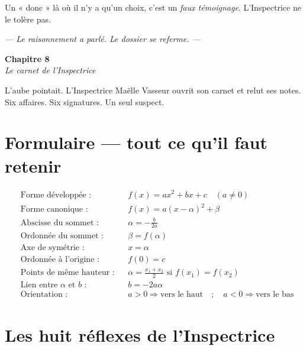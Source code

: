\documentclass[11pt,a4paper]{article}
\newcommand{\chapterheader}[2]{%
  \clearpage
  \begin{tcolorbox}[
    enhanced,
    colback=ink, colframe=ink,
    interior style={top color=ink, bottom color=charcoal, shading angle=90},
    boxrule=0pt, arc=0pt,
    left=18pt, right=18pt, top=14pt, bottom=14pt,
    width=\textwidth,
  ]
    {\color{white}\Huge\bfseries #1}\\[6pt]
    {\color{silver}\large\itshape #2}
  \end{tcolorbox}
  \vspace{6pt}
}
\begin{document}
\begin{alerte}
Un « donc » là où il n'y a qu'un choix, c'est un \emph{faux témoignage}. L'Inspectrice ne le tolère pas.
\end{alerte}

\vfill
\begin{center}
\textcolor{slate}{\itshape\small — Le raisonnement a parlé. Le dossier se referme. —}
\end{center}

\chapterheader{Chapitre 8}{Le carnet de l'Inspectrice}

L'aube pointait. L'Inspectrice Maëlle Vasseur ouvrit son carnet et relut ses notes. Six affaires. Six signatures. Un seul suspect.

\section{Formulaire — tout ce qu'il faut retenir}

\begin{indice}
\begin{align*}
  &\text{Forme développée :} && f(x) = ax^2+bx+c \quad (a \neq 0) \\[2pt]
  &\text{Forme canonique :} && f(x) = a(x-\alpha)^2+\beta \\[2pt]
  &\text{Abscisse du sommet :} && \alpha = -\frac{b}{2a} \\[2pt]
  &\text{Ordonnée du sommet :} && \beta = f(\alpha) \\[2pt]
  &\text{Axe de symétrie :} && x = \alpha \\[2pt]
  &\text{Ordonnée à l'origine :} && f(0) = c \\[2pt]
  &\text{Points de même hauteur :} && \alpha = \frac{x_1+x_2}{2} \text{ si } f(x_1)=f(x_2) \\[2pt]
  &\text{Lien entre $\alpha$ et $b$ :} && b = -2a\alpha \\[2pt]
  &\text{Orientation :} && a>0 \Rightarrow \text{vers le haut} \quad ; \quad a<0 \Rightarrow \text{vers le bas}
\end{align*}
\end{indice}

\section{Les huit réflexes de l'Inspectrice}
\end{document}
